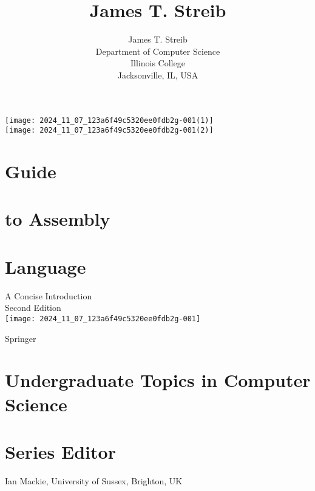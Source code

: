 \documentclass[10pt]{article}
\title{James T. Streib }
\author{James T. Streib\\
Department of Computer Science\\
Illinois College\\
Jacksonville, IL, USA}
\date{}
\begin{document}
\maketitle
\texttt{[image: 2024\_11\_07\_123a6f49c5320ee0fdb2g-001(1)]}\\
\texttt{[image: 2024\_11\_07\_123a6f49c5320ee0fdb2g-001(2)]}

\section*{Guide}
\section*{to Assembly}
\section*{Language}
A Concise Introduction\\
Second Edition\\
\texttt{[image: 2024\_11\_07\_123a6f49c5320ee0fdb2g-001]}

Springer

\section*{Undergraduate Topics in Computer Science}
\section*{Series Editor}
Ian Mackie, University of Sussex, Brighton, UK
\end{document}
